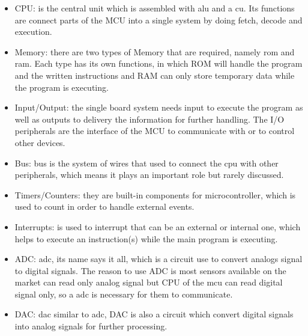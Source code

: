   \begin{itemize}
    \item CPU: is the central unit which is assembled with \gls{alu} and a \gls{cu}. Its functions are connect parts of the MCU into a single system by doing fetch, decode and execution.
    \item Memory: there are two types of Memory that are required, namely \gls{rom} and \gls{ram}. Each type has its own functions, in which ROM will handle the program and the written instructions and RAM can only store temporary data while the program is executing.
    \item Input/Output: the single board system needs input to execute the program as well as outputs to delivery the information for further handling. The I/O peripherals are the interface of the MCU to communicate with or to control other devices.
    \item Bus: bus is the system of wires that used to connect the \gls{cpu} with other peripherals, which means it plays an important role but rarely discussed.
    \item Timers/Counters: they are built-in components for microcontroller, which is used to count in order to handle external events.
    \item Interrupts: is used to interrupt that can be an external or internal one, which helps to execute an instruction(s) while the main program is executing. 
    \item ADC: \gls{adc}, its name says it all, which is a circuit use to convert analogs signal to digital signals. The reason to use ADC is most sensors available on the market can read only analog signal but CPU of the \gls{mcu} can read digital signal only, so a \gls{adc} is necessary for them to communicate.
    \item DAC: \gls{dac} similar to \gls{adc}, DAC is also a circuit which convert digital signals into analog signals for further processing.
  \end{itemize}


